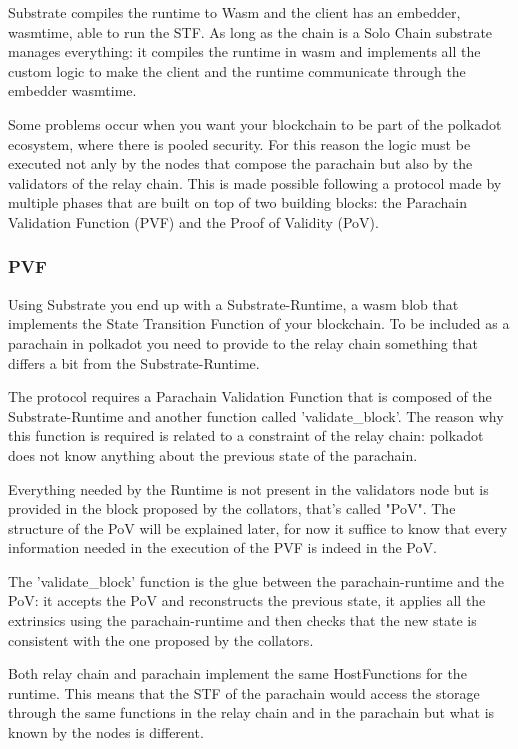 \documentclass[../main.tex]{subfiles}
\begin{document}
Substrate compiles the runtime to Wasm and the client has an embedder, wasmtime, able to run the STF. As long as the chain is a Solo Chain substrate manages everything: it compiles the runtime in wasm and implements all the custom logic to make the client and the runtime communicate through the embedder wasmtime.

Some problems occur when you want your blockchain to be part of the polkadot ecosystem, where there is pooled security. For this reason the logic must be executed not anly by the nodes that compose the parachain but also by the validators of the relay chain. This is made possible following a protocol made by multiple phases that are built on top of two building blocks: the Parachain Validation Function (PVF) and the Proof of Validity (PoV).~\cite{parachain-protocol}

\subsubsection{PVF}

Using Substrate you end up with a Substrate-Runtime,  a wasm blob that implements the State Transition Function of your blockchain. To be included as a parachain in polkadot you need to provide to the relay chain something that differs a bit from the Substrate-Runtime.

The protocol requires a Parachain Validation Function that is composed of the Substrate-Runtime and another function called 'validate\_block'. The reason why this function is required is related to a constraint of the relay chain: polkadot does not know anything about the previous state of the parachain.

Everything needed by the Runtime is not present in the validators node but is provided in the block proposed by the collators, that's called "PoV". The structure of the PoV will be explained later, for now it suffice to know that every information needed in the execution of the PVF is indeed in the PoV.

The 'validate\_block' function is the glue between the parachain-runtime and the PoV: it accepts the PoV and reconstructs the previous state, it applies all the extrinsics using the parachain-runtime and then checks that the new state is consistent with the one proposed by the collators.

Both relay chain and parachain implement the same HostFunctions for the runtime. This means that the STF of the parachain would access the storage through the same functions in the relay chain and in the parachain but what is known by the nodes is different.
\end{document}
